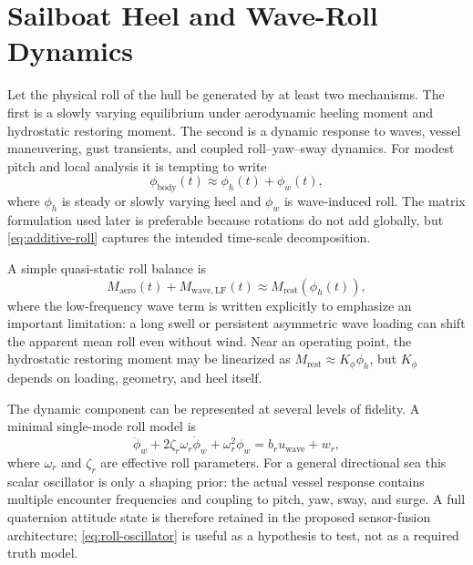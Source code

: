 \documentclass[conference]{IEEEtran}
\begin{document}
\section{Sailboat Heel and Wave-Roll Dynamics}
\label{sec:dynamics}

Let the physical roll of the hull be generated by at least two mechanisms. The first is
a slowly varying equilibrium under aerodynamic heeling moment and hydrostatic restoring
moment. The second is a dynamic response to waves, vessel maneuvering, gust transients,
and coupled roll--yaw--sway dynamics. For modest pitch and local analysis it is tempting
to write
\begin{equation}
 \phi_{\mathrm{body}}(t)\approx \phi_h(t)+\phi_w(t),
 \label{eq:additive-roll}
\end{equation}
where $\phi_h$ is steady or slowly varying heel and $\phi_w$ is wave-induced roll. The
matrix formulation used later is preferable because rotations do not add globally, but
\eqref{eq:additive-roll} captures the intended time-scale decomposition.

A simple quasi-static roll balance is
\begin{equation}
 M_{\mathrm{aero}}(t)+M_{\mathrm{wave,LF}}(t)
 \approx M_{\mathrm{rest}}\!\left(\phi_h(t)\right),
 \label{eq:heel-balance}
\end{equation}
where the low-frequency wave term is written explicitly to emphasize an important
limitation: a long swell or persistent asymmetric wave loading can shift the apparent
mean roll even without wind. Near an operating point, the hydrostatic restoring moment
may be linearized as $M_{\mathrm{rest}}\approx K_\phi\phi_h$, but $K_\phi$ depends on
loading, geometry, and heel itself.

The dynamic component can be represented at several levels of fidelity. A minimal
single-mode roll model is
\begin{equation}
 \ddot\phi_w+2\zeta_r\omega_r\dot\phi_w+\omega_r^2\phi_w
 = b_r u_{\mathrm{wave}} + w_r,
 \label{eq:roll-oscillator}
\end{equation}
where $\omega_r$ and $\zeta_r$ are effective roll parameters. For a general directional
sea this scalar oscillator is only a shaping prior: the actual vessel response contains
multiple encounter frequencies and coupling to pitch, yaw, sway, and surge. A full
quaternion attitude state is therefore retained in the proposed sensor-fusion
architecture; \eqref{eq:roll-oscillator} is useful as a hypothesis to test, not as a
required truth model.
\end{document}
